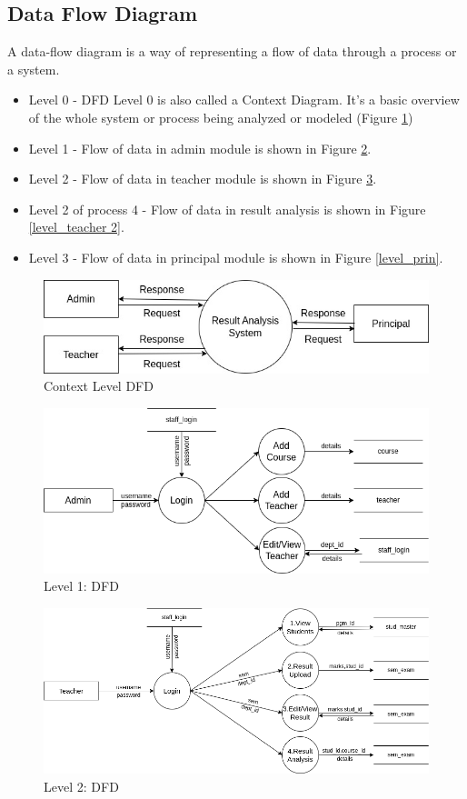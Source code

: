 \documentclass{nascproject}
\begin{document}
\subsection{Data Flow Diagram}
A data-flow diagram is a way of representing a flow of data through a process or a system. 
\begin{itemize}
	\item Level 0 - DFD Level 0 is also called a Context Diagram. It's a basic overview of the whole system or process being analyzed or modeled (Figure \ref{level_zero})
	\item Level 1 - Flow of data in admin module is shown in Figure \ref{level_one}.
	\item Level 2 - Flow of data in teacher module is shown in Figure \ref{level_teacher}.
	\item Level 2 of process 4 - Flow of data in result analysis is shown in Figure \ref{level_teacher 2}.
	\item Level 3 - Flow of data in principal module is shown in Figure \ref{level_prin}.
\end{itemize}
\begin{figure}[H]
	\centering
	\includegraphics[scale=0.4]{level_zero.jpg}
	\caption{Context Level DFD}
	\label{level_zero}
\end{figure}
\begin{figure}
	\centering
	\includegraphics[scale=0.4]{level_admin.png}
	\caption{Level 1: DFD}
	\label{level_one}
\end{figure}
\begin{figure}[H]
	\centering
	\includegraphics[scale=0.4]{level_teacher1.png}
	\caption{Level 2: DFD}
	\label{level_teacher}
\end{figure}
\end{document}
